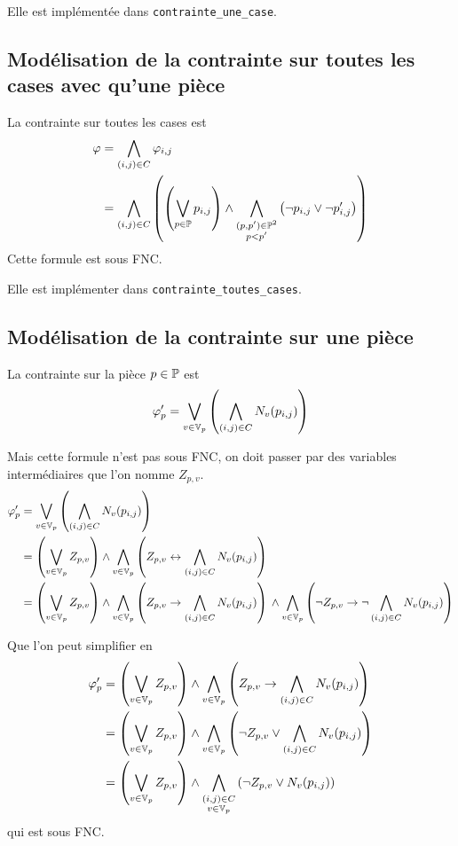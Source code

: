 Elle est implémentée dans \verb|contrainte_une_case|.

\subsection{Modélisation de la contrainte sur toutes les cases avec qu'une pièce}
La contrainte sur toutes les cases est
\begin{align*}
    \varphi &= \bigwedge_{(i,j)\in C} \varphi_{i,j} \\
            &= \bigwedge_{(i,j)\in C} \left(\left(\bigvee_{p\in\mathbb{P}} p_{i,j} \right) \land
               \bigwedge_{\substack{(p,p')\in\mathbb{P}^2\\p<p'}}\left(\lnot p_{i,j} \lor \lnot p'_{i,j}\right)\right)
\end{align*}
Cette formule est sous FNC.

Elle est implémenter dans \verb|contrainte_toutes_cases|.

\subsection{Modélisation de la contrainte sur une pièce}
La contrainte sur la pièce $p\in\mathbb{P}$ est
\begin{equation*}
    \varphi'_p = \bigvee_{v\in\mathbb{V}_p} \left( \bigwedge_{(i,j)\in C} N_v(p_{i,j}) \right)
\end{equation*}

Mais cette formule n'est pas sous FNC, on doit passer par des variables
intermédiaires que l'on nomme $Z_{p,v}$.
\begin{align*}
    \varphi'_p &= \bigvee_{v\in\mathbb{V}_p} \left( \bigwedge_{(i,j)\in C} N_v(p_{i,j}) \right)\\
               &= \left( \bigvee_{v\in\mathbb{V}_p} Z_{p,v} \right)
                  \land \bigwedge_{v\in\mathbb{V}_p} \left(Z_{p,v} \leftrightarrow \bigwedge_{(i,j)\in C} N_v(p_{i,j}) \right)\\
               &= \left( \bigvee_{v\in\mathbb{V}_p} Z_{p,v} \right)
                  \land \bigwedge_{v\in\mathbb{V}_p} \left(Z_{p,v} \to \bigwedge_{(i,j)\in C} N_v(p_{i,j}) \right){}
                  \land \bigwedge_{v\in\mathbb{V}_p} \left(\lnot Z_{p,v} \to \lnot\bigwedge_{(i,j)\in C} N_v(p_{i,j}) \right)\\
\end{align*}

Que l'on peut simplifier en
\begin{align*}
    \varphi'_p &= \left( \bigvee_{v\in\mathbb{V}_p} Z_{p,v} \right)
                  \land \bigwedge_{v\in\mathbb{V}_p} \left(Z_{p,v} \to \bigwedge_{(i,j)\in C} N_v(p_{i,j}) \right)\\
               &= \left( \bigvee_{v\in\mathbb{V}_p} Z_{p,v} \right)
                  \land \bigwedge_{v\in\mathbb{V}_p} \left(\lnot Z_{p,v} \lor \bigwedge_{(i,j)\in C} N_v(p_{i,j}) \right)\\
               &= \left( \bigvee_{v\in\mathbb{V}_p} Z_{p,v} \right)
                  \land \bigwedge_{\substack{(i,j)\in C\\v\in\mathbb{V}_p}} \left(\lnot Z_{p,v} \lor N_v(p_{i,j}) \right)\\
\end{align*}
qui est sous FNC.


